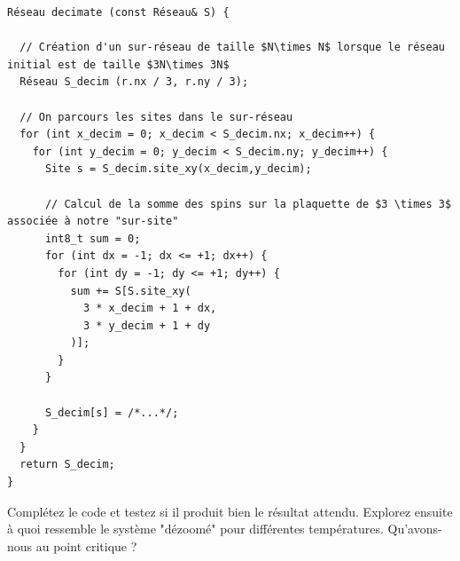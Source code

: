\documentclass{book}
\begin{document}
\begin{verbatim}
Réseau decimate (const Réseau& S) {

  // Création d'un sur-réseau de taille $N\times N$ lorsque le réseau initial est de taille $3N\times 3N$
  Réseau S_decim (r.nx / 3, r.ny / 3);

  // On parcours les sites dans le sur-réseau
  for (int x_decim = 0; x_decim < S_decim.nx; x_decim++) {
    for (int y_decim = 0; y_decim < S_decim.ny; y_decim++) {
      Site s = S_decim.site_xy(x_decim,y_decim);

      // Calcul de la somme des spins sur la plaquette de $3 \times 3$ associée à notre "sur-site"
      int8_t sum = 0;
      for (int dx = -1; dx <= +1; dx++) {
        for (int dy = -1; dy <= +1; dy++) {
          sum += S[S.site_xy(
            3 * x_decim + 1 + dx,
            3 * y_decim + 1 + dy
          )];
        }
      }

      S_decim[s] = /*...*/;
    }
  }
  return S_decim;
}
\end{verbatim}

Complétez le code et testez si il produit bien le résultat attendu. Explorez ensuite à quoi ressemble le système "dézoomé" pour différentes températures. Qu'avons-nous au point critique ?
\end{document}
